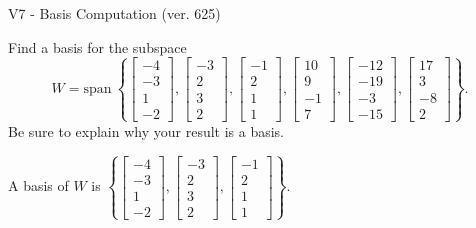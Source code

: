 \begin{exercise}
  \begin{exerciseTitle}V7 - Basis Computation (ver. 625)\end{exerciseTitle}
  \begin{exerciseStatement}
    Find a basis for the subspace 
\[W=\mathrm{span}\ \left\{\left[\begin{array}{r}
-4 \\
-3 \\
1 \\
-2
\end{array}\right] , \left[\begin{array}{r}
-3 \\
2 \\
3 \\
2
\end{array}\right] , \left[\begin{array}{r}
-1 \\
2 \\
1 \\
1
\end{array}\right] , \left[\begin{array}{r}
10 \\
9 \\
-1 \\
7
\end{array}\right] , \left[\begin{array}{r}
-12 \\
-19 \\
-3 \\
-15
\end{array}\right] , \left[\begin{array}{r}
17 \\
3 \\
-8 \\
2
\end{array}\right]\right\}.\]
 Be sure to explain why your result is a basis.


  \end{exerciseStatement}
  \begin{exerciseAnswer}
   A basis of \(W\) is  \(\left\{\left[\begin{array}{r}
-4 \\
-3 \\
1 \\
-2
\end{array}\right] , \left[\begin{array}{r}
-3 \\
2 \\
3 \\
2
\end{array}\right] , \left[\begin{array}{r}
-1 \\
2 \\
1 \\
1
\end{array}\right]\right\}\).
  


  \end{exerciseAnswer}
\end{exercise}